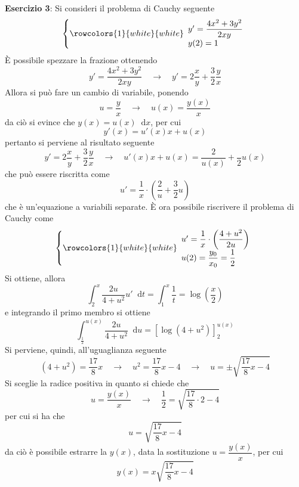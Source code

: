 \documentclass[a4paper]{extarticle}
\newcommand*\dif{\mathop{}\!\mathrm{d}}
\begin{document}
\vspace{2em}
\noindent
\textbf{Esercizio 3}: Si consideri il problema di Cauchy seguente
\[\left\{
    \rowcolors{1}{white}{white}
    \begin{array}{lll}
        y'= \dfrac{4x^2 + 3y^2}{2xy}\\
        y(2)=1
    \end{array}
\right.\]
È possibile spezzare la frazione ottenendo
\[y'= \dfrac{4x^2 + 3y^2}{2xy} \hspace{1em} \rightarrow \hspace{1em} y'=2 \dfrac{x}{y} + \dfrac{3}{2} \dfrac{y}{x}\]
Allora si può fare un cambio di variabile, ponendo
\[u=\dfrac{y}{x} \hspace{1em} \rightarrow \hspace{1em} u(x)=\dfrac{y(x)}{x}\]
da ciò si evince che $y(x)=u(x) \dif x$, per cui
\[y'(x)=u'(x)x+u(x)\]
pertanto si perviene al risultato seguente
\[y'=2 \dfrac{x}{y} + \dfrac{3}{2} \dfrac{y}{x} \hspace{1em} \rightarrow \hspace{1em} u'(x)x+u(x) = \dfrac{2}{u(x)} + \dfrac{}{2}u(x)\]
che può essere riscritta come
\[u' = \dfrac{1}{x} \cdot \left(\dfrac{2}{u}+\dfrac{3}{2} u\right)\]
che è un'equazione a variabili separate. È ora possibile riscrivere il problema di Cauchy come
\[\left\{
    \rowcolors{1}{white}{white}
    \begin{array}{lll}
        u'=\dfrac{1}{x} \cdot \left(\dfrac{4+u^2}{2u}\right)\\
        u(2)=\dfrac{y_0}{x_0}=\dfrac{1}{2}
    \end{array}
\right.\]
Si ottiene, allora
\[\int_2^x \dfrac{2u}{4+u^2} u' \dif t = \int_1^x \dfrac{1}{t} = \log \left(\dfrac{x}{2}\right)\]
e integrando il primo membro si ottiene
\[\int_\frac{1}{2}^{u(x)} \dfrac{2u}{4+u^2} \dif u = \left[\log(4+u^2)\right]_2^{u(x)}\]
Si perviene, quindi, all'uguaglianza seguente
\[(4+u^2) = \dfrac{17}{8}x \hspace{1em} \rightarrow \hspace{1em} u^2=\dfrac{17}{8}x-4 \hspace{1em} \rightarrow \hspace{1em} u=\pm \sqrt{\dfrac{17}{8}x-4}\]
Si sceglie la radice positiva in quanto si chiede che
\[u=\dfrac{y(x)}{x} \hspace{1em} \rightarrow \hspace{1em} \dfrac{1}{2}=\sqrt{\dfrac{17}{8} \cdot 2 - 4}\]
per cui si ha che
\[u=\sqrt{\dfrac{17}{8}x-4}\]
da ciò è possibile estrarre la $y(x)$, data la sostituzione $u=\dfrac{y(x)}{x}$, per cui
\[y(x)=x \sqrt{\dfrac{17}{8}x-4}\]
\end{document}
